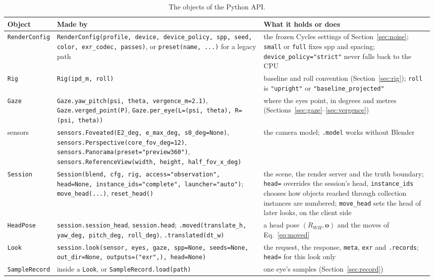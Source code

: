 \documentclass[11pt,a4paper]{article}
\newcommand{\code}[1]{\texttt{\small #1}}
\newcommand{\cell}{\raggedright\arraybackslash}
\newcommand{\vb}[1]{\mathbf{#1}}
\begin{document}
\begin{table}[!htbp]
\centering\footnotesize
\begin{tabularx}{\textwidth}{@{}>{\cell}p{2.1cm} >{\cell}p{6.6cm} L@{}}
\toprule
Object & Made by & What it holds or does \\
\midrule
\code{RenderConfig} & \code{RenderConfig(profile, device, device\_policy, spp, seed, color, exr\_codec, passes)},
  or \code{preset(name, ...)} for a legacy path & the frozen Cycles settings of Section~\ref{sec:noise};
  \code{small} or \code{full} fixes spp and spacing; \code{device\_policy="strict"} never falls back to the CPU \\
\code{Rig} & \code{Rig(ipd\_m, roll)} & baseline and roll convention (Section~\ref{sec:rig}); \code{roll} is
  \code{"upright"} or \code{"baseline\_projected"} \\
\code{Gaze} & \code{Gaze.yaw\_pitch(psi, theta, vergence\_m=2.1)}, \code{Gaze.verged\_point(P)},
  \code{Gaze.per\_eye(L=(psi, theta), R=(psi, theta))} & where the eyes point, in degrees and metres
  (Sections~\ref{sec:gaze}--\ref{sec:vergence}) \\
sensors & \code{sensors.Foveated(E2\_deg, e\_max\_deg, s0\_deg=None)}, \code{sensors.Perspective(core\_fov\_deg=12)},
  \code{sensors.Panorama(preset="preview360")}, \code{sensors.ReferenceView(width, height, half\_fov\_x\_deg)} &
  the camera model; \code{.model} works without Blender \\
\code{Session} & \code{Session(blend, cfg, rig, access="observation", head=None, instance\_ids="complete",
  launcher="auto")}; \code{move\_head(...)}, \code{reset\_head()} & the scene, the render server and the truth
  boundary; \code{head=} overrides the session's head, \code{instance\_ids} chooses how objects reached through
  collection instances are numbered; \code{move\_head} sets the head of later looks, on the client side \\
\code{HeadPose} & \code{session.session\_head}, \code{session.head}; \code{.moved(translate\_h, yaw\_deg,
  pitch\_deg, roll\_deg)}, \code{.translated(dt\_w)} & a head pose $(R_{WH}, \vb{o})$ and the moves of
  Eq.~\eqref{eq:moved} \\
\code{Look} & \code{session.look(sensor, eyes, gaze, spp=None, seeds=None, out\_dir=None, outputs=("exr",),
  head=None)} & the request, the response, \code{meta}, \code{exr} and \code{.records}; \code{head=} for this
  look only \\
\code{SampleRecord} & inside a \code{Look}, or \code{SampleRecord.load(path)} & one eye's samples
  (Section~\ref{sec:record}) \\
\bottomrule
\end{tabularx}
\caption{The objects of the Python API.}\label{tab:api}
\end{table}
\end{document}
